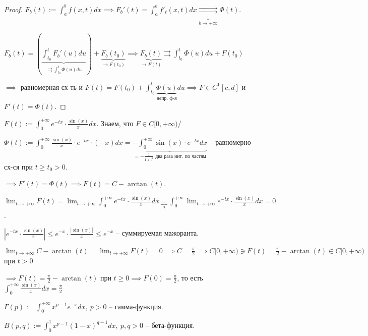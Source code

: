 \begin{proof}
    $F_b(t) := \int_{a}^{b} { f(x, t) dx } \implies F_b'(t) = \int_{a}^{b} { f'_t (x, t) dx } \underbrace{\rightrightarrows}_{b \rightarrow +\infty} \Phi(t)$.

    $F_b(t) = \left(\underbrace{\int_{t_0}^{t} { F_b'(u) du }}_{\rightrightarrows \int_{t_0}^{t} { \Phi(u) du }}\right) + \underbrace{F_b(t_0)}_{\rightarrow F(t_0)} \implies \underbrace{F_b(t)}_{\rightarrow F(t)} \rightrightarrows \int_{t_0}^{t} { \Phi(u) du } + F(t_0)$

    $\implies$ равномерная сх-ть и $F(t) = F(t_0) + \int_{t_0}^{t} { \underbrace{\Phi(u)}_{\text{непр. ф-я}} du } \implies F \in C^1[c, d]$ и $F'(t) = \Phi(t)$.
\end{proof}

\begin{example}
    $F(t) := \int_{0}^{+\infty} { e^{-tx} \cdot \frac{\sin(x)}{x} dx }$. Знаем, что $F \in C[0, +\infty)$/

    $\Phi(t) := \int_{0}^{+\infty} { \frac{\sin(x)}{x} \cdot e^{-tx} \cdot (-x) dx } = \underbrace{- \int_{0}^{+\infty} { \sin(x) \cdot e^{-tx} dx }}_{= - \frac{1}{1+t^2} \text{ два раза инт. по частям}}$ -- равномерно сх-ся при $t \geq t_0 > 0$.

    $\implies F'(t) = \Phi(t) \implies F(t) = C - \arctan(t)$.

    $\lim_{t \rightarrow + \infty} { F(t) } = \lim_{t \rightarrow +\infty} { \int_{0}^{+\infty} { e^{-tx} \cdot \frac{\sin(x)}{x} dx} } \underbrace{=}_{?} \int_{0}^{+\infty} { \lim_{t \rightarrow +\infty} { e^{-tx} \cdot \frac{\sin(x)}{x} dx } } = 0$.

    $\left| e^{-tx} \cdot \frac{\sin(x)}{x} \right| \leq e^{-x} \cdot \frac{|\sin(x)|}{x} \leq e^{-x}$ -- суммируемая мажоранта.

    $\lim_{t \rightarrow +\infty}{ C - \arctan(t) } = \lim_{t \rightarrow +\infty} { F(t) } = 0 \implies C = \frac{\pi}{2} \implies C[0, +\infty) \ni F(t) = \frac{\pi}{2} - \arctan(t) \in C[0, +\infty)$ при $t > 0$

    $\implies F(t) = \frac{\pi}{2} - \arctan(t)$ при $t \geq 0 \implies F(0) = \frac{\pi}{2}$, то есть $\int_{0}^{+\infty} { \frac{\sin(x)}{x} dx } = \frac{\pi}{2}$
\end{example}


\begin{definition}
    $\Gamma(p) := \int_{0}^{+\infty} { x^{p-1} e^{-x} dx }, \ p > 0$ -- гамма-функция.

    $B(p, q) := \int_{0}^{1} { x^{p-1} (1-x)^{q-1} dx }, \ p, q > 0$ -- бета-функция.
\end{definition}

